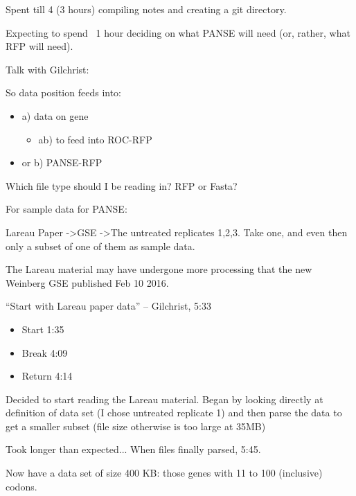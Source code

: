 \documentclass[12pt,hyperref]{labbook}
\begin{document}
Spent till 4 (3 hours) compiling notes and creating a git directory.


Expecting to spend ~1 hour deciding on what PANSE will need (or, rather, what RFP will need).

Talk with Gilchrist:

So data position feeds into:
\begin{itemize}
    \item a) data on gene 
    \begin{itemize}
        \item ab) to feed into ROC-RFP
    \end{itemize}
    \item or b) PANSE-RFP
\end{itemize}

Which file type should I be reading in? RFP or Fasta?

For sample data for PANSE:

Lareau Paper -\textgreater GSE -\textgreater The untreated replicates 1,2,3. Take one, and even then only a subset of 
one of them as sample data.

The Lareau material may have undergone more processing that the new Weinberg GSE published Feb 10 2016. 

\enquote{Start with Lareau paper data} -- Gilchrist, 5:33


\begin{itemize}
    \item Start 1:35
    \item Break 4:09
    \item Return 4:14 
\end{itemize}


Decided to start reading the Lareau material. Began by looking directly at definition of data set
(I chose untreated replicate 1) and then parse the data to get a smaller subset (file size otherwise
is too large at 35MB)

Took longer than expected... When files finally parsed, 5:45.

Now have a data set of size 400 KB: those genes with 11 to 100 (inclusive) codons. 


\end{document}
